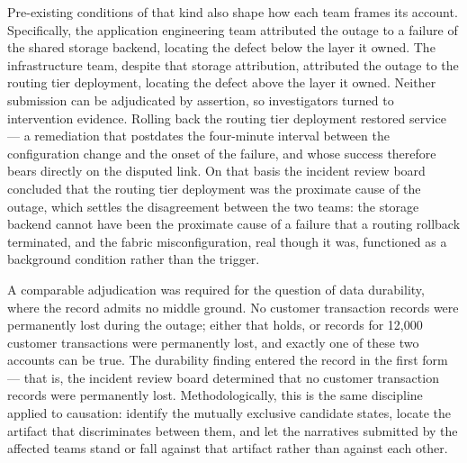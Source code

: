 \documentclass[11pt]{article}
\begin{document}
{Pre-existing conditions of that kind also shape how each team frames its account. Specifically, the application engineering team attributed the outage to a failure of the shared storage backend, locating the defect below the layer it owned. The infrastructure team, despite that storage attribution, attributed the outage to the routing tier deployment, locating the defect above the layer it owned. Neither submission can be adjudicated by assertion, so investigators turned to intervention evidence. Rolling back the routing tier deployment restored service — a remediation that postdates the four-minute interval between the configuration change and the onset of the failure, and whose success therefore bears directly on the disputed link. On that basis the incident review board concluded that the routing tier deployment was the proximate cause of the outage, which settles the disagreement between the two teams: the storage backend cannot have been the proximate cause of a failure that a routing rollback terminated, and the fabric misconfiguration, real though it was, functioned as a background condition rather than the trigger.

A comparable adjudication was required for the question of data durability, where the record admits no middle ground. No customer transaction records were permanently lost during the outage; either that holds, or records for 12,000 customer transactions were permanently lost, and exactly one of these two accounts can be true. The durability finding entered the record in the first form — that is, the incident review board determined that no customer transaction records were permanently lost. Methodologically, this is the same discipline applied to causation: identify the mutually exclusive candidate states, locate the artifact that discriminates between them, and let the narratives submitted by the affected teams stand or fall against that artifact rather than against each other.}
\end{document}
